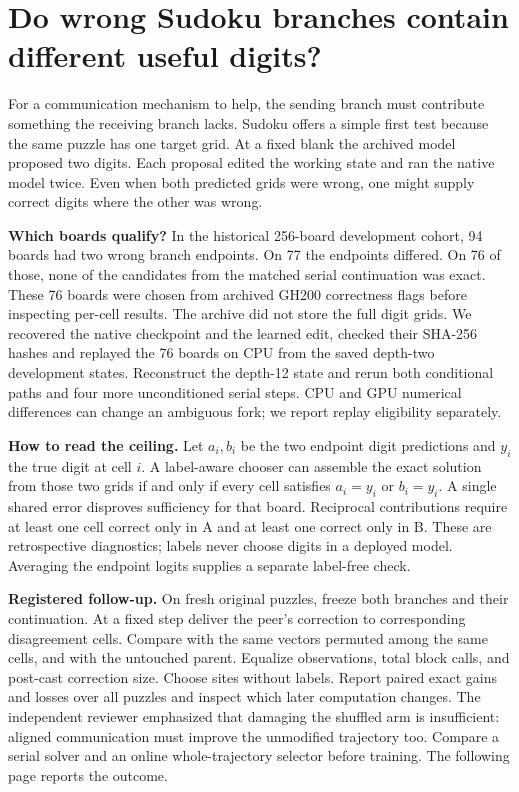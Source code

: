 \section*{Do wrong Sudoku branches contain different useful digits?}
For a communication mechanism to help, the sending branch must contribute something the receiving branch lacks. Sudoku offers a simple first test because the same puzzle has one target grid. At a fixed blank the archived model proposed two digits. Each proposal edited the working state and ran the native model twice. Even when both predicted grids were wrong, one might supply correct digits where the other was wrong.
\par
\textbf{Which boards qualify?} In the historical 256-board development cohort, 94 boards had two wrong branch endpoints. On 77 the endpoints differed. On 76 of those, none of the candidates from the matched serial continuation was exact. These 76 boards were chosen from archived GH200 correctness flags before inspecting per-cell results. The archive did not store the full digit grids. We recovered the native checkpoint and the learned edit, checked their SHA-256 hashes and replayed the 76 boards on CPU from the saved depth-two development states. Reconstruct the depth-12 state and rerun both conditional paths and four more unconditioned serial steps. CPU and GPU numerical differences can change an ambiguous fork; we report replay eligibility separately.
\par
\textbf{How to read the ceiling.} Let $a_i,b_i$ be the two endpoint digit predictions and $y_i$ the true digit at cell $i$. A label-aware chooser can assemble the exact solution from those two grids if and only if every cell satisfies $a_i=y_i$ or $b_i=y_i$. A single shared error disproves sufficiency for that board. Reciprocal contributions require at least one cell correct only in A and at least one correct only in B. These are retrospective diagnostics; labels never choose digits in a deployed model. Averaging the endpoint logits supplies a separate label-free check.
\par

\par
\textbf{Registered follow-up.} On fresh original puzzles, freeze both branches and their continuation. At a fixed step deliver the peer's correction to corresponding disagreement cells. Compare with the same vectors permuted among the same cells, and with the untouched parent. Equalize observations, total block calls, and post-cast correction size. Choose sites without labels. Report paired exact gains and losses over all puzzles and inspect which later computation changes. The independent reviewer emphasized that damaging the shuffled arm is insufficient: aligned communication must improve the unmodified trajectory too. Compare a serial solver and an online whole-trajectory selector before training. The following page reports the outcome.
